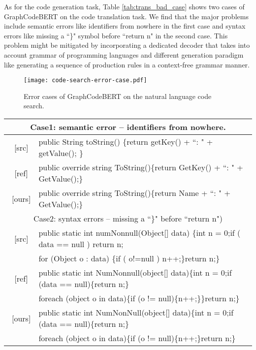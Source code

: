 \documentclass{article} \usepackage{iclr2021_conference,times}
\begin{document}
As for the code generation task, Table \ref{tab:trans_bad_case} shows two cases of GraphCodeBERT on the code translation task. We find that the major problems include semantic errors like identifiers from nowhere in the first case and syntax errors like missing a ``\}" symbol before ``return n" in the second case.
This problem might be mitigated by incorporating a dedicated decoder that takes into account grammar of programming languages and different generation paradigm like generating a sequence of production rules \citep{yin17acl, Guo2018DialogtoActionCQ,Guo2019CouplingRA} in a context-free grammar manner. 
\begin{figure}[h]
\begin{center}
		\texttt{[image: code-search-error-case.pdf]}
		\caption{Error cases of GraphCodeBERT on the natural language code search.}
		\label{fig:code-search-error-case}
	\end{center}
\end{figure}


\begin{table*}[h!]
\small
\begin{center}
\begin{tabular}{c|l}
\toprule 
\multicolumn{2}{c}{Case1: semantic error -- identifiers from nowhere.} \\
\midrule
\ [src] & public String toString() \{return getKey() + ``: " + getValue(); \} \\
\hline
\ [ref] & public override string ToString()\{return GetKey() + ``: " + GetValue();\} \\
\hline
\ [ours] & public override string ToString()\{return Name + ``: " + GetValue();\}\\
\midrule
\multicolumn{2}{c}{Case2: syntax errors -- missing a ``\}" before ``return n")} \\
\midrule
\ [src] & public static int numNonnull(Object[] data) \{int n = 0;if ( data == null ) return n;\\
& for (Object o : data) \{if ( o!=null ) n++;\}return n;\} \\
\hline
\ [ref] & public static int NumNonnull(object[] data)\{int n = 0;if (data == null)\{return n;\}\\
& foreach (object o in data)\{if (o != null)\{n++;\}\}return n;\} \\
\hline
\ [ours] & public static int NumNonNull(object[] data)\{int n = 0;if (data == null)\{return n;\}\\
&foreach (object o in data)\{if (o != null)\{n++;\}return n;\}\\
\bottomrule
\end{tabular}
\end{center}
\caption{\label{tab:trans_bad_case} Error cases of GraphCodeBERT on the code translation task.  [src] represents the source input, [ref] represents the reference and [ours] represents GraphCodeBERT.}
\end{table*}
\end{document}
